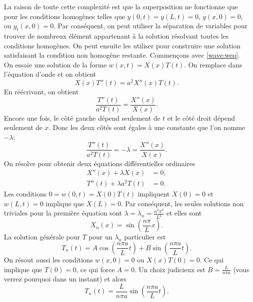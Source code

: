 La raison de toute cette complexité est que la superposition ne fonctionne que pour les
conditions homogènes telles que
$y(0,t) = y(L,t) = 0$, $y(x,0) = 0$,  ou $y_t(x,0) = 0$.  Par conséquent,
on peut utiliser la séparation de variables pour trouver de nombreux élément appartenant à la
solution résolvant toutes les conditions homogènes.  On peut  ensuite les utiliser pour
construire une solution satisfaisant la condition non homogène restante.
Commençons avec  \eqref{wave:weq}.
On essaie une solution de la forme $w(x,t) = X(x) T(t)$.  On remplace dans l'équation d'onde et on obtient 
\begin{equation*}
X(x)T''(t) = a^2 X''(x) T(t) .
\end{equation*}
En réécrivant,  on obtient 
\begin{equation*}
\frac{T''(t)}{a^2 T(t)} = \frac{X''(x)}{X(x)} .
\end{equation*}
Encore une fois, le côté gauche dépend seulement de $ t $ et le côté droit dépend
seulement de $ x $.  Donc les deux côtés sont égales à une constante que l'on nomme
$-\lambda$:
\begin{equation*}
\frac{T''(t)}{a^2 T(t)} = -\lambda = \frac{X''(x)}{X(x)} .
\end{equation*}
On résolve pour obtenir deux équations différentielles ordinaires
\begin{align*}
X''(x) + \lambda X(x) &= 0 , \\
T''(t) + \lambda a^2 T(t) &= 0 .
\end{align*}
Les conditions $0 = w(0,t) = X(0) T(t)$ impliquent $X(0) = 0$ et
$w(L,t) = 0$ implique que $X(L) = 0$.  Par conséquent,  les seules solutions non triviales
 pour la première équation sont 
$\lambda = \lambda_n = \frac{n^2 \pi^2}{L^2}$ et elles sont
\begin{equation*}
X_n(x) = \sin \left( \frac{n \pi}{L} x \right) .
\end{equation*}
La solution générale pour $T$ pour un $\lambda_n$ particulier est  
\begin{equation*}
T_n(t) = A \cos \left( \frac{n \pi a}{L} t \right)
+ B \sin \left( \frac{n \pi a}{L} t \right).
\end{equation*}
On résout aussi les conditions $w(x,0) = 0$ ou $X(x)T(0) = 0$.  Ce qui implique que $T(0) = 0$,  ce qui force $A = 0$.  Un choix judicieux est $B=\frac{L}{n \pi a}$ (vous verrez pourquoi dans un instant)
et alors
\begin{equation*}
T_n(t) = \frac{L}{n \pi a} \sin \left( \frac{n \pi a}{L} t \right).
\end{equation*}
